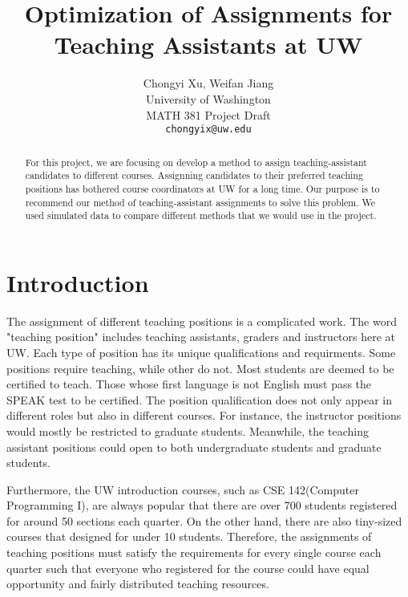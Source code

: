 \documentclass[twoside,twocolumn]{article}
\title{\LARGE \bf
    Optimization of Assignments for Teaching Assistants at UW
    }
\author{ \parbox{3 in}{\centering Chongyi Xu, Weifan Jiang \\
             University of Washington\\
             MATH 381 Project Draft\\
             {\tt\small chongyix@uw.edu}}
    }
\begin{document}
    \maketitle

    \begin{abstract}

    For this project, we are focusing on develop a method to assign teaching-assistant candidates
    to different courses. Assignning candidates to their preferred teaching positions has bothered
    course coordinators at UW for a long time. Our purpose is to recommend our method of teaching-assistant
    assignments to solve this problem. We used simulated data to compare different methods that 
    we would use in the project.
        
    \end{abstract}

    \linespread{1.05} %
    \section{Introduction}
    The assignment of different teaching positions is a complicated work. The word "teaching position" 
    includes teaching assistants, graders and instructors here at UW. Each type of position has its 
    unique qualifications and requirments. Some positions require teaching, while other do not. 
    Most students are deemed to be certified to teach. Those whose first language is not English must 
    pass the SPEAK test to be certified. The position qualification does not only appear in different roles 
    but also in different courses. For instance, the instructor positions would mostly be restricted to 
    graduate students. Meanwhile, the teaching assistant positions could open to both undergraduate students and 
    graduate students.

    
    Furthermore, the UW introduction courses, such as CSE 142(Computer Programming I), are always popular 
    that there are over 700 students registered for around 50 sections each quarter. On the other hand, there are 
    also tiny-sized courses that designed for under 10 students. Therefore, the assignments of teaching positions 
    must satisfy the requirements for every single course each quarter such that everyone who registered for the course
    could have equal opportunity and fairly distributed teaching resources.   
\end{document}

